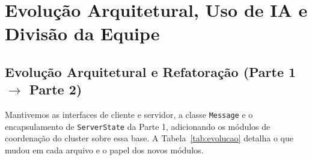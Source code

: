 \documentclass[12pt]{article}
\begin{document}
\section{Evolução Arquitetural, Uso de IA e Divisão da Equipe}

\subsection{Evolução Arquitetural e Refatoração (Parte 1 $\rightarrow$ Parte 2)}

Mantivemos as interfaces de cliente e servidor, a classe \texttt{Message} e o encapsulamento de \texttt{ServerState} da Parte 1, adicionando os módulos de coordenação do cluster sobre essa base. A Tabela~\ref{tab:evolucao} detalha o que mudou em cada arquivo e o papel dos novos módulos.
\end{document}
